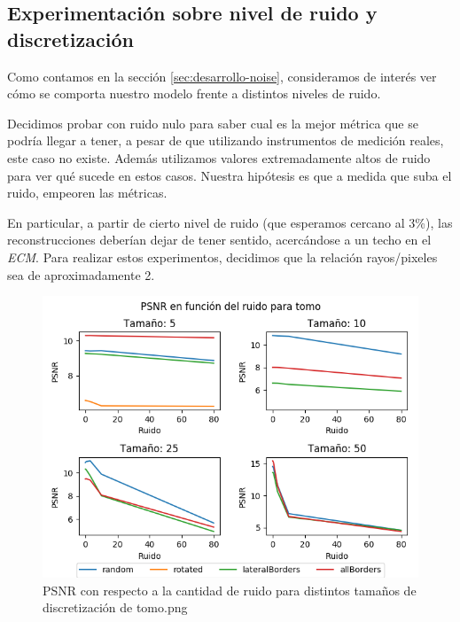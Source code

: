 \subsection{Experimentación sobre nivel de ruido y discretización}
\label{sec:exp-noise}

Como contamos en la sección \ref{sec:desarrollo-noise},
consideramos de interés ver cómo se comporta nuestro modelo frente a distintos niveles de ruido.

Decidimos probar con ruido nulo para saber cual es la mejor métrica que se podría llegar a tener,
a pesar de que utilizando instrumentos de medición reales, este caso no existe.
Además utilizamos valores extremadamente altos de ruido para ver qué sucede en estos casos.
Nuestra hipótesis es que a medida que suba el ruido, empeoren las métricas.

En particular, a partir de cierto nivel de ruido (que esperamos cercano al 3\%),
las reconstrucciones deberían dejar de tener sentido, acercándose a un techo en el \textit{ECM}.
Para realizar estos experimentos, decidimos que la relación rayos/pixeles sea de aproximadamente 2.

\begin{figure}[H]
    \centering
    \includegraphics[width=\textwidth]{../graficos/noise/tomo/noise_graph.png}
    \caption{PSNR con respecto a la cantidad de ruido para distintos tamaños de discretización de tomo.png}
    \label{fig:exp-noise-tomo}
\end{figure}

